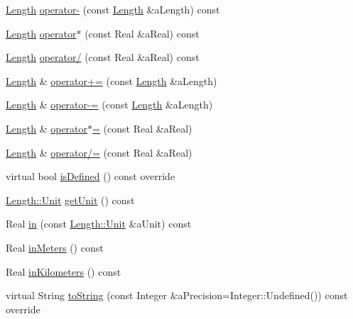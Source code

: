 \begin{DoxyCompactItemize}
\item 
\hyperlink{classostk_1_1physics_1_1units_1_1_length}{Length} \hyperlink{classostk_1_1physics_1_1units_1_1_length_a7ead71a73994b72fea9cbee1763c921f}{operator-\/} (const \hyperlink{classostk_1_1physics_1_1units_1_1_length}{Length} \&a\+Length) const
\item 
\hyperlink{classostk_1_1physics_1_1units_1_1_length}{Length} \hyperlink{classostk_1_1physics_1_1units_1_1_length_a58a2e430e8a6296e7eca6e5307d5805d}{operator$\ast$} (const Real \&a\+Real) const
\item 
\hyperlink{classostk_1_1physics_1_1units_1_1_length}{Length} \hyperlink{classostk_1_1physics_1_1units_1_1_length_a7fa05d1bb3642cb9bf8b46331f273e77}{operator/} (const Real \&a\+Real) const
\item 
\hyperlink{classostk_1_1physics_1_1units_1_1_length}{Length} \& \hyperlink{classostk_1_1physics_1_1units_1_1_length_a7903485eb0e4d3f92cdbd8436ecb5adc}{operator+=} (const \hyperlink{classostk_1_1physics_1_1units_1_1_length}{Length} \&a\+Length)
\item 
\hyperlink{classostk_1_1physics_1_1units_1_1_length}{Length} \& \hyperlink{classostk_1_1physics_1_1units_1_1_length_a9006163f65f5bb808a4956d5302f3802}{operator-\/=} (const \hyperlink{classostk_1_1physics_1_1units_1_1_length}{Length} \&a\+Length)
\item 
\hyperlink{classostk_1_1physics_1_1units_1_1_length}{Length} \& \hyperlink{classostk_1_1physics_1_1units_1_1_length_a6cb940402ce088d7b349bf4f4ca57cdf}{operator$\ast$=} (const Real \&a\+Real)
\item 
\hyperlink{classostk_1_1physics_1_1units_1_1_length}{Length} \& \hyperlink{classostk_1_1physics_1_1units_1_1_length_a5c174bd65d9f38fad8d84b82896d0ebb}{operator/=} (const Real \&a\+Real)
\item 
virtual bool \hyperlink{classostk_1_1physics_1_1units_1_1_length_aa176a675943dfe488fe96005c5405304}{is\+Defined} () const override
\item 
\hyperlink{classostk_1_1physics_1_1units_1_1_length_a2664470a7eedf5d45c88861fe69badea}{Length\+::\+Unit} \hyperlink{classostk_1_1physics_1_1units_1_1_length_a91a1b3cecc897c3f39519b26f01c431b}{get\+Unit} () const
\item 
Real \hyperlink{classostk_1_1physics_1_1units_1_1_length_ac4e43b2af197223ef81240b432f5b5af}{in} (const \hyperlink{classostk_1_1physics_1_1units_1_1_length_a2664470a7eedf5d45c88861fe69badea}{Length\+::\+Unit} \&a\+Unit) const
\item 
Real \hyperlink{classostk_1_1physics_1_1units_1_1_length_aa2d544dc47f218e40c13f498c00ae067}{in\+Meters} () const
\item 
Real \hyperlink{classostk_1_1physics_1_1units_1_1_length_a433a4673829f129b765b11ddce6c88b6}{in\+Kilometers} () const
\item 
virtual String \hyperlink{classostk_1_1physics_1_1units_1_1_length_ad3ec518939d2ffc86cd73b8ed4c071af}{to\+String} (const Integer \&a\+Precision=Integer\+::\+Undefined()) const override
\end{DoxyCompactItemize}
